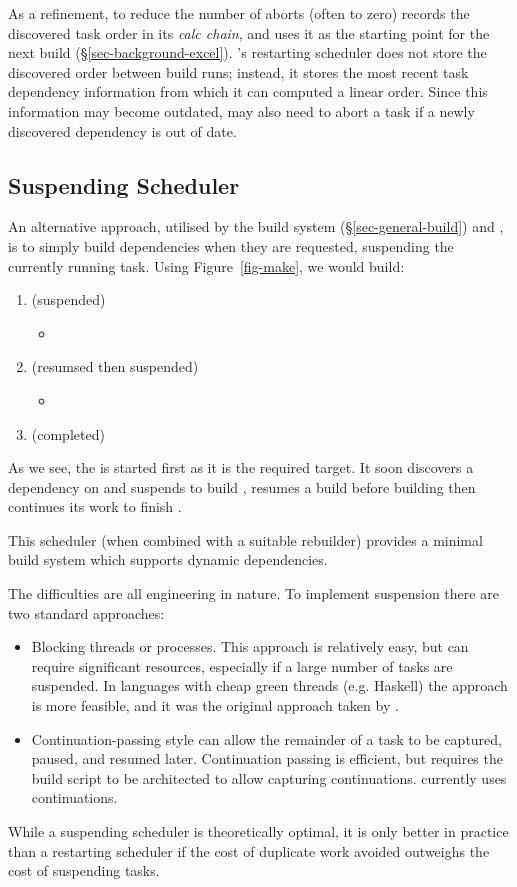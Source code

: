 As a refinement, to reduce the number of aborts (often to zero) \Excel records the
discovered task order in its \emph{calc chain}, and uses it as the
starting point for the next build (\S\ref{sec-background-excel}).
\Bazel's restarting scheduler does not store the discovered order
between build runs; instead, it stores the most recent task dependency
information from which it can computed a linear order. Since this information may become outdated, \Bazel may
also need to abort a task if a newly discovered dependency is out of date.

\subsection{Suspending Scheduler}\label{sec-suspending}

An alternative approach, utilised by the  build system
(\S\ref{sec-general-build}) and \Shake, is to simply build dependencies when
they are requested, suspending the currently running task. Using
Figure~\ref{fig-make}, we would build:

\begin{enumerate}
\item {} (suspended)
\begin{itemize}
\item {}
\end{itemize}
\item {} (resumsed then suspended)
\begin{itemize}
\item {}
\end{itemize}
\item {} (completed)
\end{enumerate}

As we see, the  is started first as it is the required target. It soon discovers
a dependency on  and suspends to build , resumes a build before building 
then continues its work to finish .

This scheduler (when combined with a suitable rebuilder) provides a minimal build system
which supports dynamic dependencies.

The difficulties are all engineering in nature. To implement suspension there are two
standard approaches:

\begin{itemize}
\item Blocking threads or processes. This approach is relatively easy, but can require
significant resources, especially if a large number of tasks are suspended. In languages with
cheap green threads (e.g. Haskell) the approach is more feasible, and it was the original approach
taken by \Shake.
\item Continuation-passing style \cite{claessen_continuations} can allow the remainder of
a task to be captured, paused, and resumed later. Continuation passing is efficient, but requires
the build script to be architected to allow capturing continuations. \Shake currently uses
continuations.
\end{itemize}

While a suspending scheduler is theoretically optimal, it is only better in practice
than a restarting scheduler if the cost of duplicate work avoided outweighs the cost of suspending tasks.
